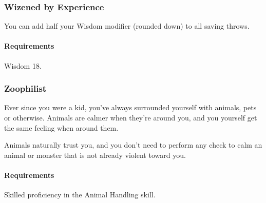 \subsubsection{Wizened by Experience} \label{feat::wizenedbyexperience}
    You can add half your Wisdom modifier (rounded down) to all saving throws.
    \paragraph{Requirements} Wisdom 18.
\subsubsection{Zoophilist} \label{feat::zoophilist}
    Ever since you were a kid, you've always surrounded yourself with animals, pets or otherwise.
    Animals are calmer when they're around you, and you yourself get the same feeling when around them.

    Animals naturally trust you, and you don't need to perform any check to calm an animal or monster that is not already violent toward you.
    \paragraph{Requirements} Skilled proficiency in the Animal Handling skill.

\newpage
